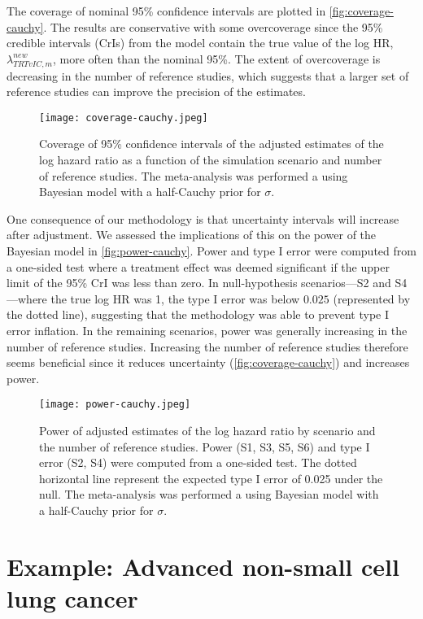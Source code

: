 \documentclass[11pt,final,fleqn]{article}\usepackage[]{graphicx}\usepackage[]{color}
\begin{document}
The coverage of nominal 95\% confidence intervals are plotted in \autoref{fig:coverage-cauchy}. The results are conservative with some overcoverage since the 95\% credible intervals (CrIs) from the model contain the true value of the log HR, $\lambda^{new}_{\textit{TRT}vIC, m}$, more often than the nominal 95\%. The extent of overcoverage is decreasing in the number of reference studies, which suggests that a larger set of reference studies can improve the precision of the estimates.

\begin{figure}[t!]
\centering
\texttt{[image: coverage-cauchy.jpeg]} 
\caption{Coverage of 95\% confidence intervals of the adjusted estimates of the log hazard ratio as a function of the simulation scenario and number of reference studies. The meta-analysis was performed a using Bayesian model with a half-Cauchy prior for $\sigma$.}
\label{fig:coverage-cauchy}
\end{figure}

One consequence of our methodology is that uncertainty intervals will increase after adjustment. We assessed the implications of this on the power of the Bayesian model in \autoref{fig:power-cauchy}. Power and type I error were computed from a one-sided test where a treatment effect was deemed significant if the upper limit of the 95\% CrI was less than zero. In null-hypothesis scenarios---S2 and S4---where the true log HR was 1, the type I error was below $0.025$ (represented by the dotted line), suggesting that the methodology was able to prevent type I error inflation. In the remaining scenarios, power was generally increasing in the number of reference studies. Increasing the number of reference studies therefore seems beneficial since it reduces uncertainty (\autoref{fig:coverage-cauchy}) and increases power.

\begin{figure}[t!]
\centering
\texttt{[image: power-cauchy.jpeg]} 
\caption{Power of adjusted estimates of the log hazard ratio by scenario and the number of reference studies. Power (S1, S3, S5, S6) and type I error (S2, S4) were computed from a one-sided test. The dotted horizontal line represent the expected type I error of 0.025 under the null. The meta-analysis was performed a using Bayesian model with a half-Cauchy prior for $\sigma$.}
\label{fig:power-cauchy}
\end{figure}

\section{ Example: Advanced non-small cell lung cancer} \label{sec:example}
\end{document}
